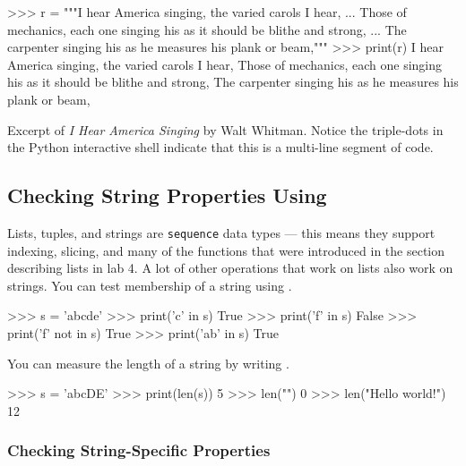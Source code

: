 \documentclass[11pt]{cselabheader}
\begin{document}
\begin{listing}[H]
  \vspace{-0.5em}
\begin{pyconcode}
>>> r = """I hear America singing, the varied carols I hear,
... Those of mechanics, each one singing his as it should be blithe and strong,
... The carpenter singing his as he measures his plank or beam,"""
>>> print(r)
I hear America singing, the varied carols I hear,
Those of mechanics, each one singing his as it should be blithe and strong,
The carpenter singing his as he measures his plank or beam,

\end{pyconcode}
  \vspace{-1em}
  \caption{Excerpt of \emph{I Hear America Singing} by Walt Whitman.
    Notice the triple-dots in the Python interactive shell indicate that
    this is a multi-line segment of code.}
  \vspace{-0.5em}
\end{listing}


\subsection{Checking String Properties Using }

Lists, tuples, and strings are \texttt{sequence} data
types --- this means they support indexing,
slicing, and many of the functions that were introduced in the section
describing lists in lab 4.
A lot of other operations that work on lists also work on strings.
You can test membership of a string using .

\begin{pyconcode}
>>> s = 'abcde'
>>> print('c' in s)
True
>>> print('f' in s)
False
>>> print('f' not in s)
True
>>> print('ab' in s)
True

\end{pyconcode}


You can measure the length of a string by writing .

\begin{pyconcode}
>>> s = 'abcDE'
>>> print(len(s))
5
>>> len("")
0
>>> len("Hello world!")
12

\end{pyconcode}


\subsubsection{Checking String-Specific Properties}
\end{document}
